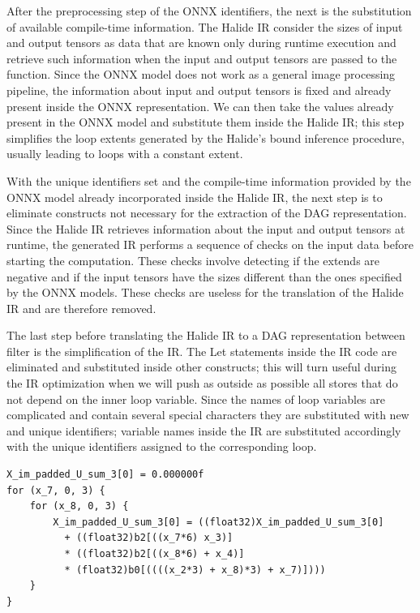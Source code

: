 \documentclass[../main.tex]{subfiles}
\begin{document}
After the preprocessing step of the ONNX identifiers, the next is the substitution of available compile-time information.
The Halide IR consider the sizes of input and output tensors as data that are known only during runtime execution and retrieve such information when the input and output tensors are passed to the function.
Since the ONNX model does not work as a general image processing pipeline, the information about input and output tensors is fixed and already present inside the ONNX representation.
We can then take the values already present in the ONNX model and substitute them inside the Halide IR; this step simplifies the loop extents generated by the Halide's bound inference procedure, usually leading to loops with a constant extent.

With the unique identifiers set and the compile-time information provided by the ONNX model already incorporated inside the Halide IR, the next step is to eliminate constructs not necessary for the extraction of the DAG representation.
Since the Halide IR retrieves information about the input and output tensors at runtime, the generated IR performs a sequence of checks on the input data before starting the computation.
These checks involve detecting if the extends are negative and if the input tensors have the sizes different than the ones specified by the ONNX models.
These checks are useless for the translation of the Halide IR and are therefore removed.

The last step before translating the Halide IR to a DAG representation between filter is the simplification of the IR.
The Let statements inside the IR code are eliminated and substituted inside other constructs; this will turn useful during the IR optimization when we will push as outside as possible all stores that do not depend on the inner loop variable.
Since the names of loop variables are complicated and contain several special characters they are substituted with new and unique identifiers; variable names inside the IR are substituted accordingly with the unique identifiers assigned to the corresponding loop.

\begin{lstlisting}[caption= Example of filter extracted from the Halide IR. The extracted code is hard to translate to c language and access the memory buffers at each iteration. ]
X_im_padded_U_sum_3[0] = 0.000000f
for (x_7, 0, 3) {
    for (x_8, 0, 3) {
        X_im_padded_U_sum_3[0] = ((float32)X_im_padded_U_sum_3[0] 
          + ((float32)b2[((x_7*6) x_3)]
          * ((float32)b2[((x_8*6) + x_4)]
          * (float32)b0[((((x_2*3) + x_8)*3) + x_7)])))
    }
}
\end{lstlisting}
\end{document}
